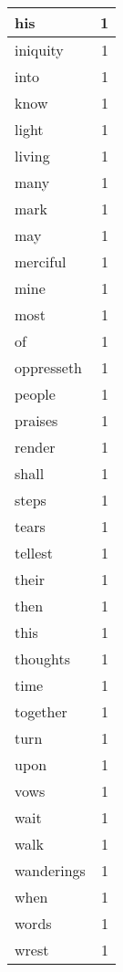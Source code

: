 \begin{center}
\begin{longtable}{l|r}
his & 1 \\ \hline
iniquity & 1 \\ \hline
into & 1 \\ \hline
know & 1 \\ \hline
light & 1 \\ \hline
living & 1 \\ \hline
many & 1 \\ \hline
mark & 1 \\ \hline
may & 1 \\ \hline
merciful & 1 \\ \hline
mine & 1 \\ \hline
most & 1 \\ \hline
of & 1 \\ \hline
oppresseth & 1 \\ \hline
people & 1 \\ \hline
praises & 1 \\ \hline
render & 1 \\ \hline
shall & 1 \\ \hline
steps & 1 \\ \hline
tears & 1 \\ \hline
tellest & 1 \\ \hline
their & 1 \\ \hline
then & 1 \\ \hline
this & 1 \\ \hline
thoughts & 1 \\ \hline
time & 1 \\ \hline
together & 1 \\ \hline
turn & 1 \\ \hline
upon & 1 \\ \hline
vows & 1 \\ \hline
wait & 1 \\ \hline
walk & 1 \\ \hline
wanderings & 1 \\ \hline
when & 1 \\ \hline
words & 1 \\ \hline
wrest & 1 \\ \hline
\end{longtable}
\end{center}



\normalsize

 
